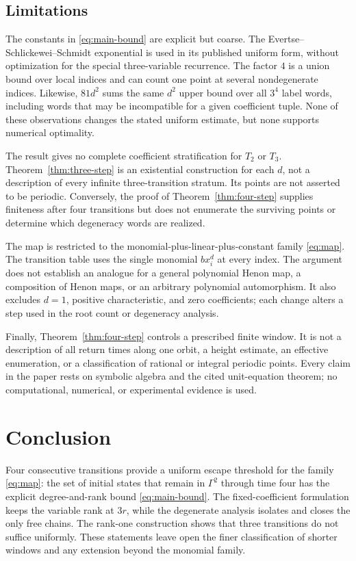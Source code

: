 \documentclass[11pt]{article}
\theoremstyle{definition}
\theoremstyle{remark}
\begin{document}
\subsection{Limitations}

The constants in \eqref{eq:main-bound} are explicit but coarse.  The
Evertse--Schlickewei--Schmidt exponential is used in its published uniform
form, without optimization for the special three-variable recurrence.  The
factor \(4\) is a union bound over local indices and can count one point at
several nondegenerate indices.  Likewise, \(81d^2\) sums the same
\(d^2\) upper bound over all \(3^4\) label words, including words that may be
incompatible for a given coefficient tuple.  None of these observations
changes the stated uniform estimate, but none supports numerical optimality.

The result gives no complete coefficient stratification for \(T_2\) or
\(T_3\).  Theorem~\ref{thm:three-step} is an existential construction for
each \(d\), not a description of every infinite three-transition stratum.
Its points are not asserted to be periodic.  Conversely, the proof of
Theorem~\ref{thm:four-step} supplies finiteness after four transitions but
does not enumerate the surviving points or determine which degeneracy words
are realized.

The map is restricted to the monomial-plus-linear-plus-constant family
\eqref{eq:map}.  The transition table uses the single monomial
\(b x_i^d\) at every index.  The argument does not establish an analogue for
a general polynomial Henon map, a composition of Henon maps, or an arbitrary
polynomial automorphism.  It also excludes \(d=1\), positive
characteristic, and zero coefficients; each change alters a step used in
the root count or degeneracy analysis.

Finally, Theorem~\ref{thm:four-step} controls a prescribed finite window.
It is not a description of all return times along one orbit, a height
estimate, an effective enumeration, or a classification of rational or
integral periodic points.  Every claim in the paper rests on symbolic
algebra and the cited unit-equation theorem; no computational, numerical,
or experimental evidence is used.

\section{Conclusion}\label{sec:conclusion}

Four consecutive transitions provide a uniform escape threshold for the
family \eqref{eq:map}: the set of initial states that remain in
\(\Gamma^2\) through time four has the explicit degree-and-rank bound
\eqref{eq:main-bound}.  The fixed-coefficient formulation keeps the variable
rank at \(3r\), while the degenerate analysis isolates and closes the only
free chains.  The rank-one construction shows that three transitions do not
suffice uniformly.  These statements leave open the finer classification of
shorter windows and any extension beyond the monomial family.
\end{document}
